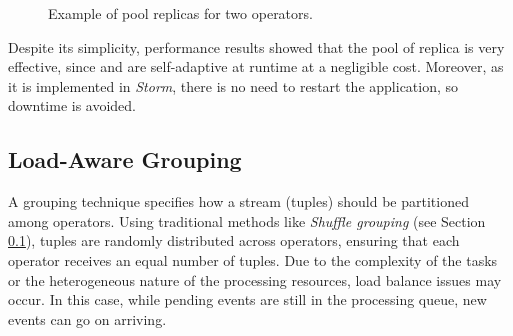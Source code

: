 \begin{figure}[!ht]
\begin{center}
 \caption{Example of pool replicas for two operators.}
    \label{fig:pool}
\end{center}
\end{figure}

Despite its simplicity, performance results showed that the pool of replica is very effective, since \rSPS{} and \pSPS{} are self-adaptive at runtime at a negligible cost. Moreover, as it is implemented in \textit{Storm}, there is no need to restart the application, so downtime is avoided.

\subsection{Load-Aware Grouping}
\label{grouping}
A grouping technique specifies how a stream (tuples) should be partitioned among operators. Using traditional methods like \textit{Shuffle grouping} (see Section \ref{grouping}), tuples are randomly distributed across operators, ensuring that each operator receives an equal number of tuples. Due to the complexity of the tasks or the heterogeneous nature of the processing resources, load balance issues may occur. In this case, while pending events are still in the processing queue, new events can go on arriving. 

